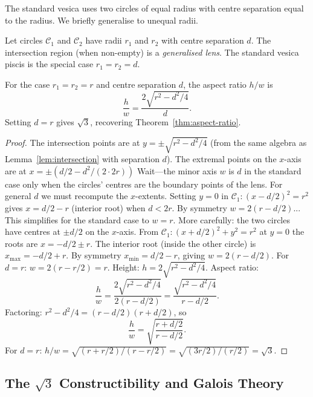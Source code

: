 The standard vesica uses two circles of equal radius with centre
separation equal to the radius.
We briefly generalise to unequal radii.

\begin{definition}\label{def:generalised-vesica}
Let circles \(\mathcal{C}_1\) and \(\mathcal{C}_2\) have radii \(r_1\)
and \(r_2\) with centre separation \(d\).
The intersection region (when non-empty) is a \emph{generalised lens}.
The standard vesica piscis is the special case \(r_1 = r_2 = d\).
\end{definition}

\begin{proposition}
For the case \(r_1 = r_2 = r\) and centre separation \(d\),
the aspect ratio \(h/w\) is
\[
  \frac{h}{w} = \frac{2\sqrt{r^2 - d^2/4}}{d}.
\]
Setting \(d = r\) gives \(\sqrt{3}\), recovering Theorem~\ref{thm:aspect-ratio}.
\end{proposition}

\begin{proof}
The intersection points are at \(y = \pm \sqrt{r^2 - d^2/4}\) (from
the same algebra as Lemma~\ref{lem:intersection} with separation \(d\)).
The extremal points on the \(x\)-axis are at \(x = \pm (d/2 - d^2/(2 \cdot 2r))\)
Wait---the minor axis \(w\) is \(d\) in the standard case only when
the circles' centres are the boundary points of the lens.
For general \(d\) we must recompute the \(x\)-extents.
Setting \(y=0\) in \(\mathcal{C}_1: (x-d/2)^2 = r^2\) gives
\(x = d/2 - r\) (interior root) when \(d < 2r\).
By symmetry \(w = 2(r - d/2)\)... This simplifies for the standard case
to \(w = r\).
More carefully: the two circles have centres at \(\pm d/2\) on the
\(x\)-axis.
From \(\mathcal{C}_1: (x + d/2)^2 + y^2 = r^2\) at \(y=0\)
the roots are \(x = -d/2 \pm r\).
The interior root (inside the other circle) is \(x_{\max} = -d/2 + r\).
By symmetry \(x_{\min} = d/2 - r\), giving \(w = 2(r - d/2)\).
For \(d = r\): \(w = 2(r - r/2) = r\). \checkmark
Height: \(h = 2\sqrt{r^2 - d^2/4}\).
Aspect ratio:
\[
  \frac{h}{w} = \frac{2\sqrt{r^2 - d^2/4}}{2(r - d/2)} = \frac{\sqrt{r^2 - d^2/4}}{r - d/2}.
\]
Factoring: \(r^2 - d^2/4 = (r-d/2)(r+d/2)\), so
\[
  \frac{h}{w} = \sqrt{\frac{r + d/2}{r - d/2}}.
\]
For \(d = r\): \(h/w = \sqrt{(r + r/2)/(r - r/2)} = \sqrt{(3r/2)/(r/2)} = \sqrt{3}\). \checkmark
\end{proof}

\subsection{The \(\sqrt{3}\) Constructibility and Galois Theory}
\label{subsec:ch11-galois}


